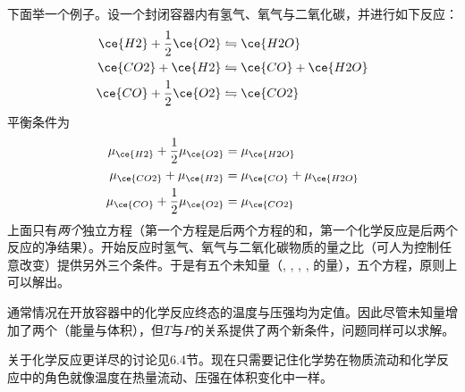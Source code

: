 下面举一个例子。设一个封闭容器内有氢气、氧气与二氧化碳，并进行如下反应：
\begin{equation}
\begin{split}
	\ce{H2} + \frac{1}{2} \ce{O2} &\leftrightharpoons \ce{H2O} \\
	\ce{CO2} + \ce{H2} &\leftrightharpoons \ce{CO} + \ce{H2O} \\
	\ce{CO} + \frac{1}{2} \ce{O2} &\leftrightharpoons \ce{CO2}
\end{split}
\label{equ2.71}
\end{equation}
平衡条件为
\begin{equation}
\begin{split}
	\mu_{\ce{H2}} + \frac{1}{2} \mu_{\ce{O2}} &= \mu_{\ce{H2O}} \\
	\mu_{\ce{CO2}} + \mu_{\ce{H2}} &= \mu_{\ce{CO}} + \mu_{\ce{H2O}} \\
	\mu_{\ce{CO}} + \frac{1}{2} \mu_{\ce{O2}} &= \mu_{\ce{CO2}}
\end{split}
\label{equ2.72}
\end{equation}
上面只有{\it 两个}独立方程（第一个方程是后两个方程的和，第一个化学反应是后两个反应的净结果）。开始反应时氢气、氧气与二氧化碳物质的量之比（可人为控制任意改变）提供另外三个条件。于是有五个未知量（, , , , 的量），五个方程，原则上可以解出。

通常情况在开放容器中的化学反应终态的温度与压强均为定值。因此尽管未知量增加了两个（能量与体积），但$T$与$P$的关系提供了两个新条件，问题同样可以求解。

关于化学反应更详尽的讨论见6.4节。现在只需要记住化学势在物质流动和化学反应中的角色就像温度在热量流动、压强在体积变化中一样。
